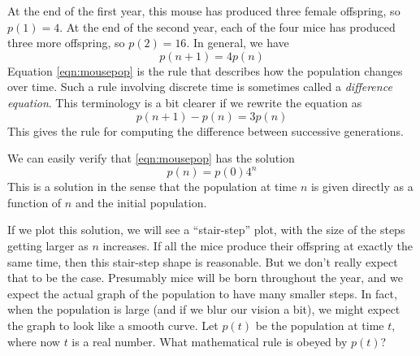 \documentclass[reqno]{immbook}
\numberwithin{equation}{chapter}
\numberwithin{question}{section}
\numberwithin{theorem}{chapter}
\numberwithin{figure}{chapter}
\theoremstyle{definition}
\begin{document}
At the end of the first year, this mouse has produced
three female offspring,
so $p(1) = 4$.  At the end of the second year,
each of the four mice has produced three more offspring,
so $p(2) = 16$.
In general, we have
\begin{equation}
   p(n+1) = 4p(n)
\label{eqn:mousepop}
\end{equation}
Equation \eqref{eqn:mousepop} is the rule that describes
how the population changes over time.  Such a rule
involving discrete time is sometimes called 
a \emph{difference equation}.
This terminology is a bit clearer if we rewrite the
equation as
\begin{equation}
    p(n+1)-p(n) = 3p(n)
\label{eqn:mousepopdiff}
\end{equation}
This gives the rule for computing the difference
between successive generations.

We can easily verify that \eqref{eqn:mousepop}
has the solution
\begin{equation}
   p(n) = p(0)4^n
\label{eqn:mousepopsol}
\end{equation}
This is a solution in the sense that the 
population at time $n$ is given directly
as a function of $n$ and the initial
population.

If we plot this solution, we will see
a ``stair-step'' plot, with the size of
the steps getting larger as $n$ increases.
If all the mice produce their offspring
at exactly the same time, then this stair-step
shape is reasonable. But we don't really expect
that to be the case.  Presumably mice will
be born throughout the year, and we expect the
actual graph of the population to have many smaller steps.
In fact, when the
population is large (and if we blur our vision
a bit), we might expect the graph to look like
a smooth curve.
Let $p(t)$ be the population at time $t$, where
now $t$ is a real number.
What mathematical
rule is obeyed by $p(t)$?
\end{document}
